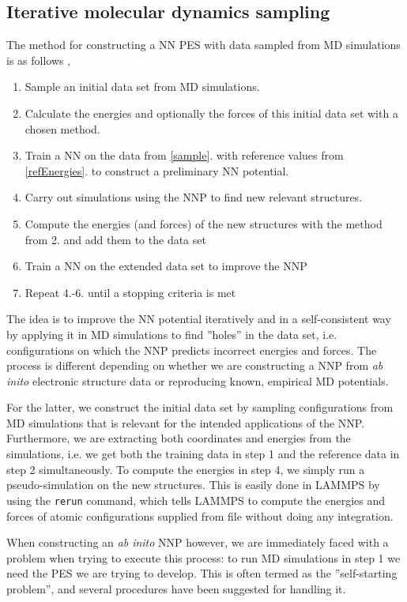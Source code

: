 \documentclass[twoside,english]{uiofysmaster}
\begin{document}
\subsection{Iterative molecular dynamics sampling}
The method for constructing a NN PES with data sampled from MD simulations is as follows \cite{Behler11general}
\cite{Behler15},
\begin{enumerate}
 \item Sample an initial data set from MD simulations. \label{sample} 
 \item Calculate the energies and optionally the forces of this initial data set with a chosen method. \label{refEnergies}
 \item Train a NN on the data from \ref{sample}. with reference values from \ref{refEnergies}. to
 construct a preliminary NN potential.
 \item Carry out simulations using the NNP to find new relevant structures. 
 \item Compute the energies (and forces) of the new structures with the method from 2. and add them to the data set
 \item Train a NN on the extended data set to improve the NNP
 \item Repeat 4.-6. until a stopping criteria is met
  \label{NNPalgorithm}
\end{enumerate}
The idea is to improve the NN potential iteratively and in a self-consistent 
way by applying it in MD simulations to find 
''holes'' in the data set, i.e. configurations on which the NNP predicts incorrect energies and forces. The process
is different depending on whether we are constructing a NNP from \textit{ab inito} electronic structure data
or reproducing known, empirical MD potentials. 

For the latter, we construct the initial data set by sampling configurations from MD simulations that is relevant
for the intended applications of the NNP. Furthermore, we are extracting both coordinates and energies from the simulations, i.e.
we get both the training data in step 1 and the reference data in step 2 simultaneously. To compute the energies in
step 4, we simply run a pseudo-simulation on the new structures. This is easily done in LAMMPS by using 
the \texttt{rerun} command, which tells LAMMPS to compute the energies and forces of atomic configurations 
supplied from file without doing any integration. 

When constructing an \textit{ab inito} NNP however, we are immediately faced with a problem when trying to execute this process: 
to run MD simulations in step 1 we need the PES we are trying to develop. 
This is often termed as the ''self-starting problem'', 
and several procedures have been suggested for handling it. 
\end{document}
